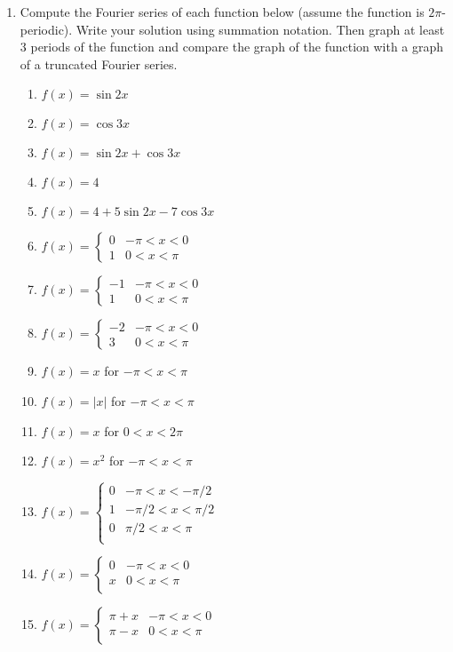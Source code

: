 \begin{enumerate}
	\item Compute the Fourier series of each function below (assume the function is $2\pi$-periodic). Write your solution using summation notation. Then graph at least 3 periods of the function and compare the graph of the function with a graph of a truncated Fourier series.
	\begin{multicols}{2}
\begin{enumerate}
	\item $f(x) = \sin 2x$
	\item $f(x) = \cos 3x$
	\item $f(x) = \sin 2x + \cos 3x$
	\item $f(x) = 4$
	\item $f(x) = 4+5\sin 2x -7\cos 3x$
	\item $f(x) = 
	\begin{cases}
	0 & -\pi<x<0\\
	1 & 0<x<\pi
	\end{cases}$
	\item $f(x) = 
	\begin{cases}
	-1 & -\pi<x<0\\
	1 & 0<x<\pi
	\end{cases}$
	\item $f(x) = 
	\begin{cases}
	-2 & -\pi<x<0\\
	3 & 0<x<\pi
	\end{cases}$
	\item $f(x) = x$ for $-\pi<x<\pi$
	\item $f(x) = |x|$ for $-\pi<x<\pi$
	\item $f(x) = x$ for $0<x<2\pi$
	\item $f(x) = x^2$ for $-\pi<x<\pi$
	\item $f(x) = 
	\begin{cases}
	0 & -\pi<x<-\pi/2\\
	1 & -\pi/2<x<\pi/2\\
	0 & \pi/2<x<\pi\\
	\end{cases}$
	\item $f(x) = 
	\begin{cases}
	0 & -\pi<x<0\\
	x & 0<x<\pi\\
	\end{cases}$
	\item $f(x) = 
	\begin{cases}
	\pi+x & -\pi<x<0\\
	\pi-x & 0<x<\pi\\
	\end{cases}$
	

\end{enumerate}
\end{multicols}
\end{enumerate}
